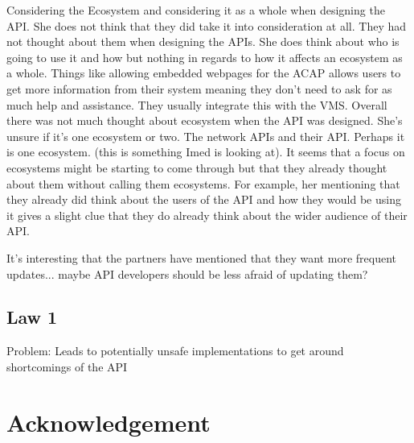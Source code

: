 \documentclass[conference]{IEEEtran}
\begin{document}
Considering the Ecosystem and considering it as a whole when designing the API. She does not think that they did take it into consideration at all. They had not thought about them when designing the APIs. She does think about who is going to use it and how but nothing in regards to how it affects an ecosystem as a whole. Things like allowing embedded webpages for the ACAP allows users to get more information from their system meaning they don’t need to ask for as much help and assistance. They usually integrate this with the VMS. Overall there was not much thought about ecosystem when the API was designed. She’s unsure if it’s one ecosystem or two. The network APIs and their API. Perhaps it is one ecosystem. (this is something Imed is looking at).
It seems that a focus on ecosystems might be starting to come through but that they already thought about them without calling them ecosystems. For example, her mentioning that they already did think about the users of the API and how they would be using it gives a slight clue that they do already think about the wider audience of their API.



It's interesting that the partners have mentioned that they want more frequent updates... maybe API developers should be less afraid of updating them? 


\subsection{Law 1}

Problem: Leads to potentially unsafe implementations to get around shortcomings of the API

\section*{Acknowledgement} \label{acknowledgement}




\end{document}
